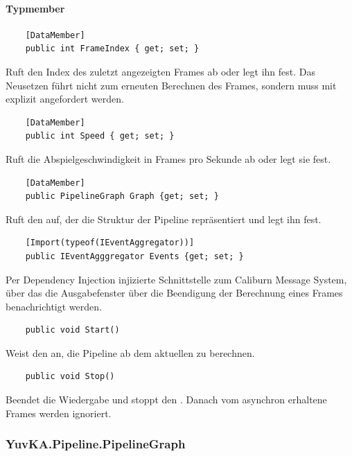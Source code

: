 \paragraph{Typmember}
\begin{itemize}

	\begin{verbatim}
	[DataMember]
	public int FrameIndex { get; set; }
	\end{verbatim}
	Ruft den Index des zuletzt angezeigten Frames ab oder legt ihn fest. Das Neusetzen führt nicht zum erneuten Berechnen des Frames, sondern muss mit  explizit angefordert werden.

	\begin{verbatim}
	[DataMember]
	public int Speed { get; set; }
	\end{verbatim}
	Ruft die Abspielgeschwindigkeit in Frames pro Sekunde ab oder legt sie fest.

	\begin{verbatim}
	[DataMember]
	public PipelineGraph Graph {get; set; }
	\end{verbatim}
	Ruft den  auf, der die Struktur der Pipeline repräsentiert und legt ihn fest.

	\begin{verbatim}
	[Import(typeof(IEventAggregator))]
	public IEventAgggregator Events {get; set; }
	\end{verbatim}
	Per Dependency Injection injizierte Schnittstelle zum Caliburn Message System, über das die Ausgabefenster über die Beendigung der Berechnung eines Frames benachrichtigt werden.



	\begin{verbatim}
	public void Start()
	\end{verbatim}
	Weist den  an, die Pipeline ab dem aktuellen  zu berechnen.

	\begin{verbatim}
	public void Stop()
	\end{verbatim}
	Beendet die Wiedergabe und stoppt den . Danach vom  asynchron erhaltene Frames werden ignoriert.
\end{itemize}

\subsubsection{YuvKA.Pipeline.PipelineGraph}
	
